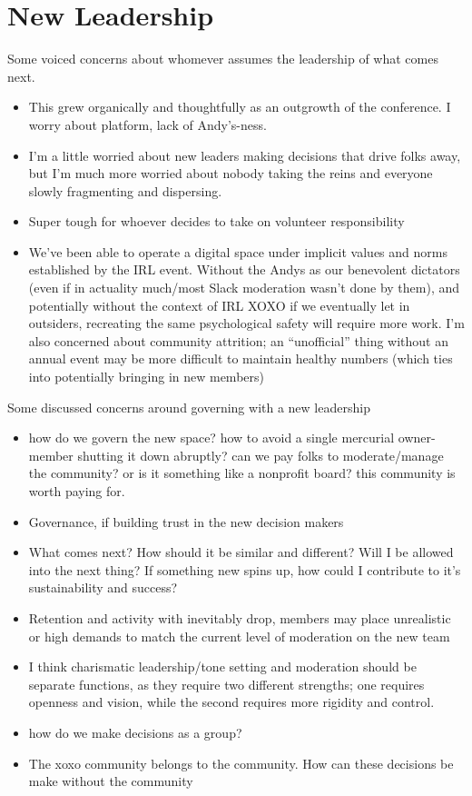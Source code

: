 \documentclass[
]{book}
\providecommand{\tightlist}{%
  \setlength{\itemsep}{0pt}\setlength{\parskip}{0pt}}
\begin{document}
\section{New Leadership}\label{new-leadership}

Some voiced concerns about whomever assumes the leadership of what comes next.

\begin{itemize}
\tightlist
\item
  This grew organically and thoughtfully as an outgrowth of the conference. I worry about platform, lack of Andy's-ness.
\item
  I'm a little worried about new leaders making decisions that drive folks away, but I'm much more worried about nobody taking the reins and everyone slowly fragmenting and dispersing.
\item
  Super tough for whoever decides to take on volunteer responsibility
\item
  We've been able to operate a digital space under implicit values and norms established by the IRL event. Without the Andys as our benevolent dictators (even if in actuality much/most Slack moderation wasn't done by them), and potentially without the context of IRL XOXO if we eventually let in outsiders, recreating the same psychological safety will require more work. I'm also concerned about community attrition; an ``unofficial'' thing without an annual event may be more difficult to maintain healthy numbers (which ties into potentially bringing in new members)
\end{itemize}

Some discussed concerns around governing with a new leadership

\begin{itemize}
\tightlist
\item
  how do we govern the new space? how to avoid a single mercurial owner-member shutting it down abruptly? can we pay folks to moderate/manage the community? or is it something like a nonprofit board? this community is worth paying for.
\item
  Governance, if building trust in the new decision makers
\item
  What comes next? How should it be similar and different? Will I be allowed into the next thing? If something new spins up, how could I contribute to it's sustainability and success?
\item
  Retention and activity with inevitably drop, members may place unrealistic or high demands to match the current level of moderation on the new team
\item
  I think charismatic leadership/tone setting and moderation should be separate functions, as they require two different strengths; one requires openness and vision, while the second requires more rigidity and control.
\item
  how do we make decisions as a group?
\item
  The xoxo community belongs to the community. How can these decisions be make without the community
\end{itemize}
\end{document}
